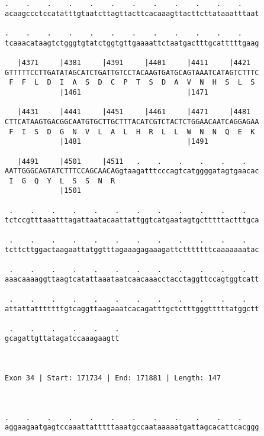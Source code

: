 \documentclass{article}
\begin{document}
\begin{Verbatim}
.    .    .    .    .    .    .    .    .    .    .    .    
acaagccctccatatttgtaatcttagttacttcacaaagttacttcttataaatttaat
                                                            
.    .    .    .    .    .    .    .    .    .    .    .    
tcaaacataagtctgggtgtatctggtgttgaaaattctaatgactttgcatttttgaag
                                                            
   |4371     |4381     |4391     |4401     |4411     |4421  
GTTTTTCCTTGATATAGCATCTGATTGTCCTACAAGTGATGCAGTAAATCATAGTCTTTC
 F  F  L  D  I  A  S  D  C  P  T  S  D  A  V  N  H  S  L  S 
             |1461                         |1471            
  
   |4431     |4441     |4451     |4461     |4471     |4481  
CTTCATAAGTGACGGCAATGTGCTTGCTTTACATCGTCTACTCTGGAACAATCAGGAGAA
 F  I  S  D  G  N  V  L  A  L  H  R  L  L  W  N  N  Q  E  K 
             |1481                         |1491            
  
   |4491     |4501     |4511   .    .    .    .    .    .   
AATTGGGCAGTATCTTTCCAGCAACAGgtaagatttcccagtcatggggatagtgaacac
 I  G  Q  Y  L  S  S  N  R                                  
             |1501                                          
  
 .    .    .    .    .    .    .    .    .    .    .    .   
tctccgtttaaatttagattaatacaattattggtcatgaatagtgctttttactttgca
                                                            
 .    .    .    .    .    .    .    .    .    .    .    .   
tcttcttggactaagaattatggtttagaaagagaaagattctttttttcaaaaaaatac
                                                            
 .    .    .    .    .    .    .    .    .    .    .    .   
aaacaaaaggttaagtcatattaaataatcaacaaacctacctaggttccagtggtcatt
                                                            
 .    .    .    .    .    .    .    .    .    .    .    .   
attattatttttttgtcaggttaagaaatcacagatttgctctttgggtttttatggctt
                                                            
 .    .    .    .    .    .
gcagattgttatagatccaaagaagtt
                           
                           
 
Exon 34 | Start: 171734 | End: 171881 | Length: 147



.    .    .    .    .    .    .    .    .    .    .    .    
aggaagaatgagtccaaattatttttaaatgccaataaaaatgattagcacattcacggg
                                                            

\end{Verbatim}
\end{document}
